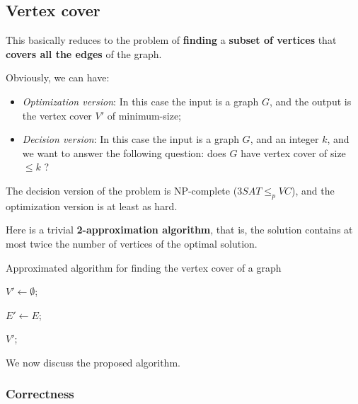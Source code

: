 \subsection{Vertex cover}

This basically reduces to the problem of \textbf{finding} a \textbf{subset of vertices} that \textbf{covers all the edges} of the graph.


Obviously, we can have:

\begin{itemize}
    \item \textit{Optimization version}: In this case the input is a graph $G$, and the output is the vertex cover $V'$ of minimum-size;
    \item \textit{Decision version}: In this case the input is a graph $G$, and an integer $k$, and we want to answer the following question: does $G$ have vertex cover of size $\leq k$ ?
\end{itemize}

The decision version of the problem is NP-complete ($3SAT \leq_p VC$), and the optimization version is at least as hard. 

Here is a trivial \textbf{2-approximation algorithm}, that is, the solution contains at most twice the number of vertices of the optimal solution.

\begin{algorithm} \caption{Approximated algorithm for finding the vertex cover of a graph}

  $V' \xleftarrow{} \emptyset$;

  $E' \xleftarrow{} E$;

  \Return $V'$;
  
\end{algorithm}

We now discuss the proposed algorithm.

\subsubsection{Correctness} 

